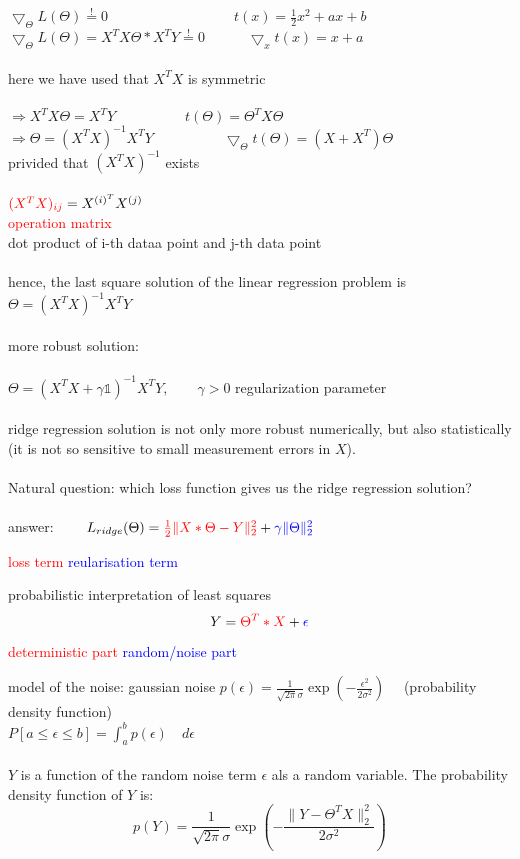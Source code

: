 	$\bigtriangledown_{\Theta} L(\Theta) \stackrel{!}{=} 0 \quad\quad\quad\quad\quad\quad\quad\quad\quad  t(x) = \frac{1}{2}x^2+ax+b$\\
	$\bigtriangledown_{\Theta} L(\Theta) = X^T X \Theta * X^T Y \stackrel{!}{=} 0  \quad\quad\quad \bigtriangledown_x t(x) = x+a$\\\\
	here we have used that $X^T X$ is symmetric\\\\
	$\Rightarrow X^T X \Theta = X^T Y \quad\quad\quad\quad\quad t(\Theta) = \Theta^T X \Theta$\\
	$\Rightarrow  \Theta = (X^T X)^{-1} X^T Y \quad\quad\quad\quad\quad \bigtriangledown_{\Theta} t(\Theta) = (X+X^T)\Theta$\\
	privided that $(X^T X)^{-1}$ exists\\\\
	$\textcolor{red}{(X^T X)_{ij}} = X^{(i)^T}X^{(j)}$\\
	\textcolor{red}{operation matrix}\\
	dot product of i-th dataa point and j-th data point\\\\
	hence, the last square solution of the linear regression problem is $\Theta = (X^T X)^{-1} X^T Y$\\\\
	more robust solution:\\\\
	$\Theta = (X^T X + \gamma \mathds{1})^{-1} X^T Y, \quad\quad \gamma > 0$ regularization parameter\\\\
	ridge regression solution is not only more robust numerically, but also statistically (it is not so sensitive to small measurement errors in $X$).\\\\
	Natural question: which loss function gives us the ridge regression solution?\\\\
	answer: $\quad\quad L_{ridge} (\Theta)= \textcolor{red}{\frac{1}{2} \lVert X * \Theta - Y \lVert_2^2} + \textcolor{blue}{\gamma \lVert \Theta \lVert_2^2}$
	\begin{center}
	\textcolor{red}{loss term} \space\space \textcolor{blue}{reularisation term}
	\end{center}
	probabilistic interpretation of least squares
	\[ Y = \textcolor{red}{\Theta^T * X} + \textcolor{blue}{\epsilon} \]
	\begin{center}
	\textcolor{red}{deterministic part} \space\space \textcolor{blue}{random/noise part}
	\end{center}
	model of the noise: gaussian noise \space\space $p(\epsilon)= \frac{1}{\sqrt{2\pi}\sigma} \exp (- \frac{\epsilon^2}{2 \sigma^2}) \quad$ (probability density function)\\
	$P[a \leq \epsilon \leq b] = \int_a^b p(\epsilon)\quad d\epsilon$\\\\
	$Y$ is a function of the random noise term $\epsilon$ als a random variable. The probability density function of $Y$ is:
	\[ p(Y) = \frac{1}{\sqrt{2 \pi}\sigma} \exp(- \frac{\lVert Y - \Theta^T X \lVert^2_2}{2 \sigma^2})\]
